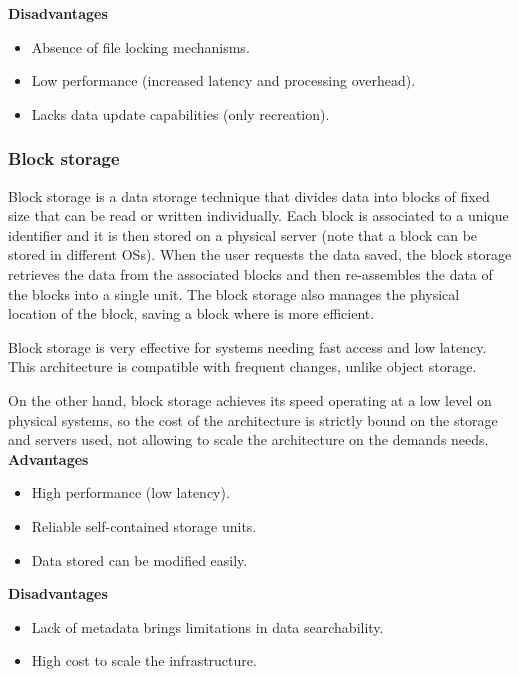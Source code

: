 \noindent\textbf{Disadvantages}
\begin{itemize}
    \item Absence of file locking mechanisms.
    \item Low performance (increased latency and processing overhead).
    \item Lacks data update capabilities (only recreation).
\end{itemize}

\subsubsection*{Block storage}

Block storage is a data storage technique that divides data into blocks of fixed size that can be read or written individually. Each block is associated to a unique identifier and it is then stored on a physical server (note that a block can be stored in different \glspl{OS}). When the user requests the data saved, the block storage retrieves the data from the associated blocks and then re-assembles the data of the blocks into a single unit. The block storage also manages the physical location of the block, saving a block where is more efficient.

Block storage is very effective for systems needing fast access and low latency. This architecture is compatible with frequent changes, unlike object storage.

On the other hand, block storage achieves its speed operating at a low level on physical systems, so the cost of the architecture is strictly bound on the storage and servers used, not allowing to scale the architecture on the demands needs. \\[3mm]
\noindent\textbf{Advantages}
\begin{itemize}
    \item High performance (low latency).
    \item Reliable self-contained storage units.
    \item Data stored can be modified easily.
\end{itemize}

\noindent\textbf{Disadvantages}
\begin{itemize}
    \item Lack of metadata brings limitations in data searchability.
    \item High cost to scale the infrastructure.
\end{itemize}

